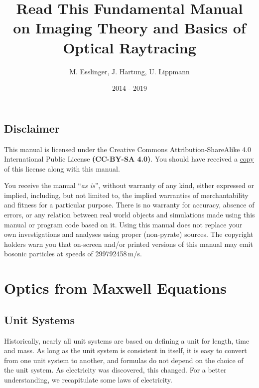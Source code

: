 \documentclass[12pt,a4paper,twoside,openright,BCOR10mm,headsepline,titlepage,abstracton,chapterprefix,final]{scrreprt}
\begin{document}

\titlehead{ }
\subject{Pyrate -- Optical raytracing based on Python}
\title{Read This Fundamental Manual \\ on Imaging Theory and Basics of Optical Raytracing}
\author{M. Esslinger, J. Hartung, U. Lippmann}
\date{2014 - 2019}
\publishers{}
\maketitle

\onehalfspacing

\tableofcontents

\cleardoublepage


\singlespacing

\section{Disclaimer}

This manual is licensed under the
Creative Commons Attribution-ShareAlike 4.0 International Public License
\textbf{(CC-BY-SA 4.0)}.
You should have received a \href{rtfm_license.html}{copy} of this license along with this manual.

You receive the manual ``\emph{as is}'', without warranty of any kind, either expressed or implied, 
including, but not limited to, the implied warranties of merchantability and fitness for a particular purpose.
There is no warranty for accuracy, absence of errors, or any relation between real world objects and simulations made 
using this manual or program code based on it.
Using this manual does not replace your own investigations and analyses using proper (non-pyrate) sources. 
The copyright holders warn you that on-screen and/or printed versions of this manual may emit bosonic particles at speeds of 299792458\,m/s.

\chapter{Optics from Maxwell Equations}
\section{Unit Systems}
Historically, nearly all unit systems are based on defining a unit for length, time and mass.
As long as the unit system is consistent in itself, 
it is easy to convert from one unit system to another, and formulas do not depend on the choice of the unit system.
As electricity was discovered, this changed.
For a better understanding, we recapitulate some laws of electricity.
\end{document}
